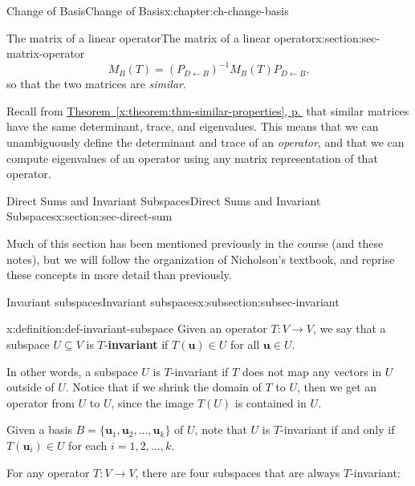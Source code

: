 \documentclass[oneside,10pt,]{book}
\newcommand{\xreffont}{\relax}
\newcommand{\terminology}[1]{\textbf{#1}}
\numberwithin{equation}{section}
\newcommand{\uu}{\mathbf{u}}
\newcommand{\basis}[2]{\{\mathbf{#1}_1,\mathbf{#1}_2,\ldots,\mathbf{#1}_{#2}\}}
\begin{document}
\begin{chapterptx}{Change of Basis}{}{Change of Basis}{}{}{x:chapter:ch-change-basis}
\begin{sectionptx}{The matrix of a linear operator}{}{The matrix of a linear operator}{}{}{x:section:sec-matrix-operator}
\begin{equation*}
M_B(T) = (P_{D\leftarrow B})^{-1}M_B(T)P_{D\leftarrow B}\text{,}
\end{equation*}
so that the two matrices are \emph{similar}.%
\par
Recall from \hyperref[x:theorem:thm-similar-properties]{Theorem~{\xreffont\ref{x:theorem:thm-similar-properties}}, p.\,\pageref{x:theorem:thm-similar-properties}} that similar matrices have the same determinant, trace, and eigenvalues. This means that we can unambiguously define the determinant and trace of an  \emph{operator}, and that we can compute eigenvalues of an operator using any matrix representation of that operator.%
\end{sectionptx}
%
%
\typeout{************************************************}
\typeout{************************************************}
%
\begin{sectionptx}{Direct Sums and Invariant Subspaces}{}{Direct Sums and Invariant Subspaces}{}{}{x:section:sec-direct-sum}
\begin{introduction}{}%
Much of this section has been mentioned previously in the course (and these notes), but we will follow the organization of Nicholson's textbook, and reprise these concepts in more detail than previously.%
\end{introduction}%
%
%
\typeout{************************************************}
\typeout{************************************************}
%
\begin{subsectionptx}{Invariant subspaces}{}{Invariant subspaces}{}{}{x:subsection:subsec-invariant}
\begin{definition}{}{x:definition:def-invariant-subspace}%
Given an operator \(T:V\to V\), we say that a subspace \(U\subseteq V\) is \(T\)-\terminology{invariant} if \(T(\uu)\in U\) for all \(\uu\in U\).%
\end{definition}
In other words, a subspace \(U\) is \(T\)-invariant if \(T\) does not map any vectors in \(U\) outside of \(U\). Notice that if we shrink the domain of \(T\) to \(U\), then we get an operator from \(U\) to \(U\), since the image \(T(U)\) is contained in \(U\).%
\par
Given a basis \(B=\basis{u}{k}\) of \(U\), note that \(U\) is \(T\)-invariant if and only if \(T(\uu_i)\in U\) for each \(i=1,2,\ldots, k\).%
\par
For any operator \(T:V\to V\), there are four subspaces that are always \(T\)-invariant:%

\end{subsectionptx}
\end{sectionptx}
\end{chapterptx}
\end{document}
